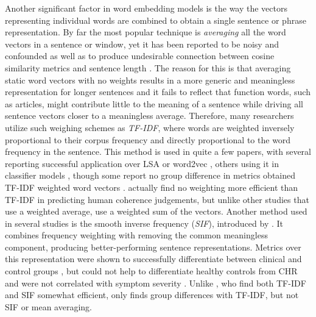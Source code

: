 Another significant factor in word embedding models is the way the vectors representing individual words are combined to obtain a single sentence or phrase representation. By far the most popular technique is \textit{averaging} all the word vectors in a sentence or window, yet it has been reported to be noisy and confounded \citep{fradkin2023theory} as well as to produce undesirable connection between cosine similarity metrics and sentence length \citep{hitczenko2021understanding, parola2022speech, fradkin2023theory}. The reason for this is that averaging static word vectors with no weights results in a more generic and meaningless representation for longer sentences and it fails to reflect that function words, such as articles, might contribute little to the meaning of a sentence while driving all sentence vectors closer to a meaningless average. Therefore, many researchers utilize such weighing schemes as \textit{TF-IDF}, where words are weighted inversely proportional to their corpus frequency and directly proportional to the word frequency in the sentence. This method is used in quite a few papers, with several reporting successful application over LSA \citep{iter2018automatic} or word2vec \citep{just2019coherence, xu2022fully}, others using it in classifier models \citep{ryazanskaya2020automated, tang2023latent}, though some report no group difference in metrics obtained TF-IDF weighted word vectors \citep{just2020modeling, hitczenko2021understanding}. \citet{xu2020centroid} actually find no weighting more efficient than TF-IDF in predicting human coherence judgements, but unlike other studies that use a weighted average,  \citet{xu2020centroid} use a weighted sum of the vectors. Another method used in several studies is the smooth inverse frequency (\textit{SIF}), introduced by \citet{arora2017simple}. It combines frequency weighting with removing the common meaningless component, producing better-performing sentence representations. Metrics over this representation were shown to successfully differentiate between clinical and control groups \citep{iter2018automatic, ryazanskaya2020thesis, morgan2021natural, nettekoven2023semantic}, but could not help to differentiate healthy controls from CHR \citep{hitczenko2021understanding} and were not correlated with symptom severity \citep{iter2018automatic, ryazanskaya2020thesis, hitczenko2021understanding, morgan2021natural}. Unlike \citet{iter2018automatic}, who find both TF-IDF and SIF somewhat efficient, \citet{just2019coherence} only finds group differences with TF-IDF, but not SIF or mean averaging. 

